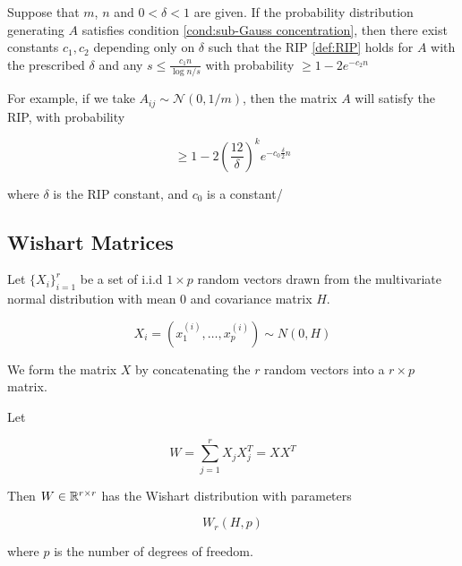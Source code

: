 \begin{theorem}
Suppose that \(m\), \(n\) and \(0 < \delta < 1\) are given. If the probability distribution generating \(A\) satisfies condition \eqref{cond:sub-Gauss concentration}, then there exist constants \(c_1, c_2\) depending only on \(\delta\) such that the RIP \eqref{def:RIP} holds for \(A\) with the prescribed \(\delta\) and any  \(s \leq \frac{c_1 n}{\log{n/s}}\) with probability \(\geq 1-2e^{-c_2n}\) 
\end{theorem}

For example, if we take \(A_{ij} \sim \mathcal{N}\left(0, 1/m\right)\), then the matrix \(A\) will satisfy the RIP, with probability \cite{baraniuk2008simple}

\begin{equation}
\geq 1-2\left(\frac{12}{\delta}\right)^k e^{-c_0\frac{\delta}{2}n}
\end{equation}

where \(\delta\) is the RIP constant, and \(c_0\) is a constant/

\subsection{Wishart Matrices}\label{sec:wishart}

Let \(\{X_i\}_{i=1}^r\) be a set of i.i.d \(1 \times p\) random vectors drawn from the multivariate normal distribution with mean 0 and covariance matrix \(H\).

\begin{equation}
X_i = \left(x_1^{(i)}, \ldots , x_p^{(i)}\right) \sim N\left(0, H\right)
\end{equation}

We form the matrix \(X\) by concatenating the \(r\) random vectors into a \(r \times p\) matrix.

\begin{definition}
Let 

\begin{equation}
W = \sum_{j=1}^r X_j X_j^T =  X X^T
\end{equation}

Then \(W \in {\mathbb{R}}^{r \times r}\) has the Wishart distribution with parameters 

\begin{equation}
W_r\left(H, p\right)
\end{equation}

where \(p\) is the number of degrees of freedom.
\end{definition}


